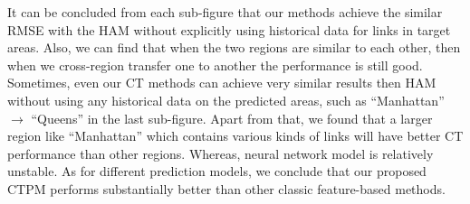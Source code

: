 It can be concluded from each sub-figure that our methods achieve the similar RMSE with the HAM without explicitly using historical data for links in target areas.
Also, we can find that when the two regions are similar to each other, 
then when we cross-region transfer one to another the performance is still good. 
Sometimes, even our CT methods can achieve very similar results then HAM without using any historical data on the predicted areas, such as ``Manhattan'' $\rightarrow$ ``Queens'' in the last sub-figure.
Apart from that, we found that a larger region like ``Manhattan'' which contains various kinds of links will have better CT performance than other regions.
Whereas, neural network model is relatively unstable. 
As for different prediction models, we conclude that our proposed CTPM performs substantially better than other classic feature-based methods.




